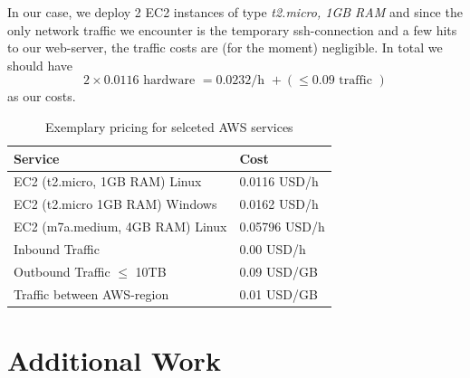 In our case, we deploy 2 EC2 instances of type \textsl{t2.micro, 1GB RAM} and since the only network traffic we encounter is the temporary ssh-connection and a few hits to our web-server, the traffic costs are (for the moment) negligible.
In total we should have $$ 2 \times 0.0116 \text{ hardware } = 0.0232 \text{/h } + (\leq 0.09 \text{ traffic }) $$ as our costs.

\begin{table}
	\centering
	\begin{tabular}{|l|l|}
	\hline
	Service & Cost \\
	\hline
	EC2 (t2.micro, 1GB RAM) Linux & 0.0116 USD/h \\
	\hline
	EC2 (t2.micro 1GB RAM) Windows & 0.0162 USD/h \\
	\hline
	EC2 (m7a.medium, 4GB RAM) Linux & 0.05796 USD/h \\
	\hline
	Inbound Traffic & 0.00 USD/h \\
	\hline
	Outbound Traffic $\le$ 10TB & 0.09 USD/GB \\
	\hline
	Traffic between AWS-region & 0.01 USD/GB \\
	\hline
\end{tabular}
\caption{Exemplary pricing for selceted AWS services}
\label{tab:pricing_AWS_exemple}
\end{table}

\section{Additional Work}



